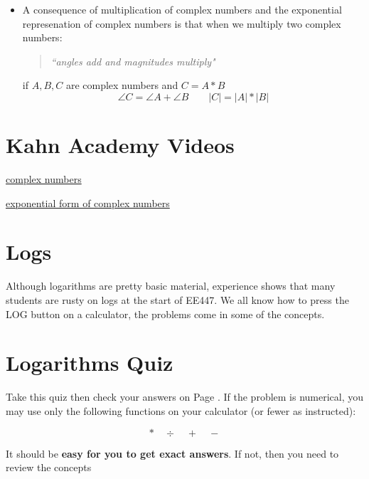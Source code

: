 \begin{itemize}
  \item A consequence of multiplication of complex numbers and the exponential represenation of complex numbers is that when we multiply two complex numbers:
     \begin{quotation} {\it ``angles add and magnitudes multiply"}
     \end{quotation}
   if $A,B,C$ are complex numbers and $C = A * B$
   \[
    \angle{C} = \angle{A}+\angle{B}  \qquad   |C| = |A|*|B|
   \]


\end{itemize}

\section{Kahn Academy Videos}\label{KahnV}

\href{https://www.khanacademy.org/math/algebra/complex-numbers/complex_numbers/v/complex-numbers}{complex numbers}

\href{https://www.khanacademy.org/math/trigonometry/imaginary_complex_precalc/complex_analysis/v/exponential-form-to-find-complex-roots}{exponential form of complex numbers}








\section{Logs}\label{LogReview}

Although logarithms are pretty basic material, experience shows that many students are rusty on logs at the start of EE447.
We all know how to press the LOG button on a calculator, the problems come in some of the concepts.


\section{Logarithms Quiz}

Take this quiz then check your answers on Page \pageref{Log_answers}.  If the problem is numerical, you may use only the following functions on your calculator (or fewer as instructed):

\[
* \quad \div \quad + \quad -
\]


It should be {\bf easy for you to get exact answers}.  If not, then you need to review the concepts


